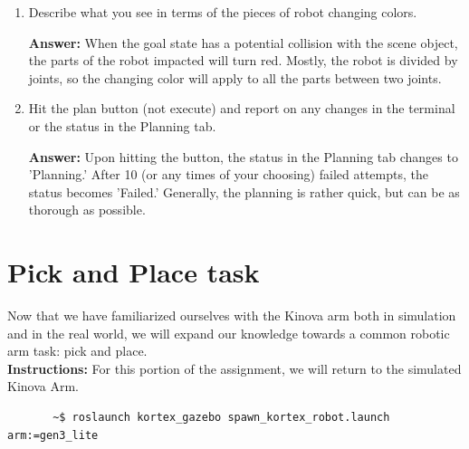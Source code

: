 \documentclass[12pt]{article}
\begin{document}
    \begin{enumerate}

        \item Describe what you see in terms of the pieces of robot changing colors.
        
        \textbf{Answer: }When the goal state has a potential collision with the scene object, the parts of the robot impacted will turn red. Mostly, the robot is divided by joints, so the changing color will apply to all the parts between two joints.  

        \item Hit the plan button (not execute) and report on any changes in the terminal or the status in the Planning tab.
        
        \textbf{Answer: } Upon hitting the button, the status in the Planning tab changes to 'Planning.' After 10 (or any times of your choosing) failed attempts, the status becomes 'Failed.' Generally, the planning is rather quick, but can be as thorough as possible.
    
    \end{enumerate}


\section{Pick and Place task}

Now that we have familiarized ourselves with the Kinova arm both in simulation and in the real world, we will expand our knowledge towards a common robotic arm task: pick and place.\\

\textbf{Instructions:}
For this portion of the assignment, we will return to the simulated Kinova Arm.

    \begin{verbatim}
       ~$ roslaunch kortex_gazebo spawn_kortex_robot.launch arm:=gen3_lite
    \end{verbatim}
\end{document}
